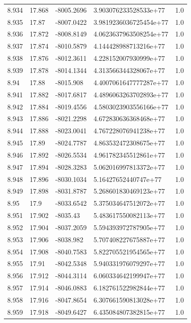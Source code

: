 \begin{tabular}{lllll}
8.934 & 17.868 & -8005.2696 & 3.903076233528533e+77 & 1.0 \\
8.935 & 17.87 & -8007.0422 & 3.9819236036725454e+77 & 1.0 \\
8.936 & 17.872 & -8008.8149 & 4.0623637963508254e+77 & 1.0 \\
8.937 & 17.874 & -8010.5879 & 4.144428988713216e+77 & 1.0 \\
8.938 & 17.876 & -8012.3611 & 4.228152007930999e+77 & 1.0 \\
8.939 & 17.878 & -8014.1344 & 4.313566344328067e+77 & 1.0 \\
8.94 & 17.88 & -8015.908 & 4.4007061647777287e+77 & 1.0 \\
8.941 & 17.882 & -8017.6817 & 4.4896063263702893e+77 & 1.0 \\
8.942 & 17.884 & -8019.4556 & 4.5803023903556166e+77 & 1.0 \\
8.943 & 17.886 & -8021.2298 & 4.672830636368468e+77 & 1.0 \\
8.944 & 17.888 & -8023.0041 & 4.767228076941238e+77 & 1.0 \\
8.945 & 17.89 & -8024.7787 & 4.863532472308675e+77 & 1.0 \\
8.946 & 17.892 & -8026.5534 & 4.961782345512861e+77 & 1.0 \\
8.947 & 17.894 & -8028.3283 & 5.062016997813372e+77 & 1.0 \\
8.948 & 17.896 & -8030.1034 & 5.16427652440747e+77 & 1.0 \\
8.949 & 17.898 & -8031.8787 & 5.268601830469123e+77 & 1.0 \\
8.95 & 17.9 & -8033.6542 & 5.375034647512072e+77 & 1.0 \\
8.951 & 17.902 & -8035.43 & 5.483617550082113e+77 & 1.0 \\
8.952 & 17.904 & -8037.2059 & 5.594393972787905e+77 & 1.0 \\
8.953 & 17.906 & -8038.982 & 5.707408227675887e+77 & 1.0 \\
8.954 & 17.908 & -8040.7583 & 5.822705521954565e+77 & 1.0 \\
8.955 & 17.91 & -8042.5348 & 5.940331976079297e+77 & 1.0 \\
8.956 & 17.912 & -8044.3114 & 6.060334642199947e+77 & 1.0 \\
8.957 & 17.914 & -8046.0883 & 6.182761522982844e+77 & 1.0 \\
8.958 & 17.916 & -8047.8654 & 6.307661590813028e+77 & 1.0 \\
8.959 & 17.918 & -8049.6427 & 6.435084807382815e+77 & 1.0 \\

\end{tabular}
